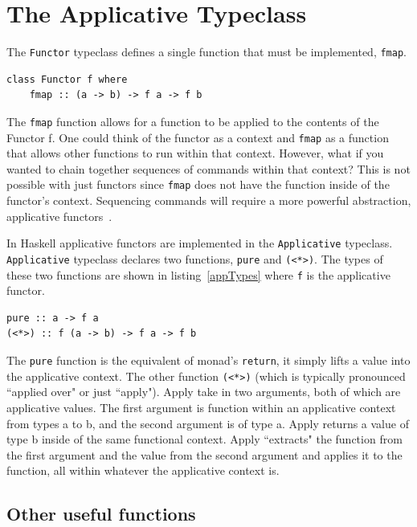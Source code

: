 \section{The Applicative Typeclass}
\label{sec:appOverview}

The \texttt{Functor} typeclass defines a single function that must be implemented, \texttt{fmap}.

\begin{lstlisting}[frame=tblr]
class Functor f where
	fmap :: (a -> b) -> f a -> f b
\end{lstlisting}

The \texttt{fmap} function allows for a function to be applied to the contents of the Functor f. One could think of the functor as a context and \texttt{fmap} as a function that allows other functions to run within that context. However, what if you wanted to chain together sequences of commands within that context? This is not possible with just functors since \texttt{fmap} does not have the function inside of the functor's context. Sequencing commands will require a more powerful abstraction, applicative functors~\citep{realWorldHaskell}. 

In Haskell applicative functors are implemented in the \texttt{Applicative} typeclass. \texttt{Applicative} typeclass declares two functions, \texttt{pure} and \texttt{(<*>)}. The types of these two functions are shown in listing~\ref{appTypes} where \texttt{f} is the applicative functor. 

\begin{lstlisting}[frame=tblr,label=appTypes,caption={Types of Applicative's minimal complete definition}]
pure :: a -> f a
(<*>) :: f (a -> b) -> f a -> f b
\end{lstlisting}

The \texttt{pure} function is the equivalent of monad's \texttt{return}, it simply lifts a value into the applicative context. The other function \texttt{(<*>)} (which is typically pronounced ``applied over" or just ``apply"). Apply take in two arguments, both of which are applicative values. The first argument is function within an applicative context from types a to b, and the second argument is of type a. Apply returns a value of type b inside of the same functional context. Apply ``extracts" the function from the first argument and the value from the second argument and applies it to the function, all within whatever the applicative context is.

\subsection{Other useful functions}

